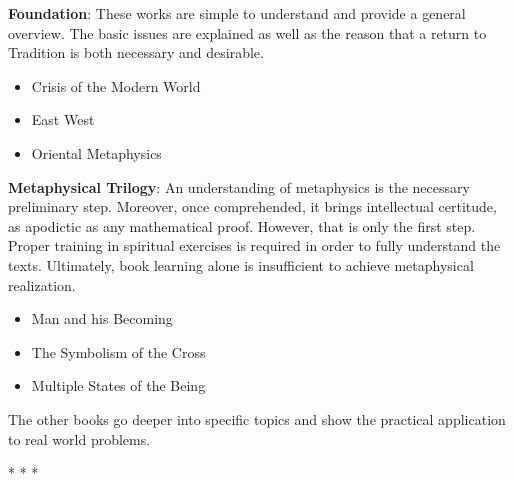 \textbf{Foundation}: These works are simple to understand and provide a general overview. The basic issues are explained as well as the reason that a return to Tradition is both necessary and desirable.

\begin{itemize}
\item Crisis of the Modern World 
\item East West 
\item Oriental Metaphysics 
\end{itemize}
\textbf{Metaphysical Trilogy}: An understanding of metaphysics is the necessary preliminary step. Moreover, once comprehended, it brings intellectual certitude, as apodictic as any mathematical proof. However, that is only the first step. Proper training in spiritual exercises is required in order to fully understand the texts. Ultimately, book learning alone is insufficient to achieve metaphysical realization.

\begin{itemize}
\item Man and his Becoming 
\item The Symbolism of the Cross 
\item Multiple States of the Being 
\end{itemize}
The other books go deeper into specific topics and show the practical application to real world problems.




\begin{center}* * *\end{center}

